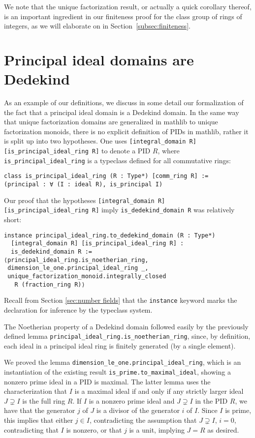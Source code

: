 \documentclass[sn-mathphys]{sn-jnl}%
\newcommand{\lean}[1]{\texttt{#1}\xspace}
\newcommand{\mathlib}{\textsf{mathlib}\xspace}
\begin{document}
We note that the unique factorization result, or actually a quick corollary thereof, is an important ingredient in our finiteness proof for the class group of rings of integers, as we will elaborate on in Section~\ref{subsec:finiteness}.

\section{Principal ideal domains are Dedekind}

As an example of our definitions, we discuss in some detail our formalization of the fact that a principal ideal domain is a Dedekind domain.
In the same way that unique factorization domains are generalized in \mathlib to unique factorization monoids,
there is no explicit definition of PIDs in \mathlib, rather it is split up into two hypotheses.
One uses \lean{[integral\_domain R] [is\_principal\_ideal\_ring R]} to denote a PID $R$,
where \lean{is\_principal\_\-ideal\_\-ring} is a typeclass defined for all commutative rings:
\begin{lstlisting}
class is_principal_ideal_ring (R : Type*) [comm_ring R] :=
(principal : ∀ (I : ideal R), is_principal I)
\end{lstlisting}

Our proof that the hypotheses \lean{[integral\_domain R] [is\_principal\_\-ideal\_\-ring R]} imply \lean{is\_dedekind\_domain R} was relatively short:
\begin{lstlisting}
instance principal_ideal_ring.to_dedekind_domain (R : Type*)
  [integral_domain R] [is_principal_ideal_ring R] :
  is_dedekind_domain R :=
⟨principal_ideal_ring.is_noetherian_ring,
 dimension_le_one.principal_ideal_ring _,
 unique_factorization_monoid.integrally_closed
   R (fraction_ring R)⟩
\end{lstlisting}
Recall from Section \ref{sec:number fields} that the \lean{instance} keyword marks the declaration for inference by the typeclass system.

The Noetherian property of a Dedekind domain followed easily by the previously defined lemma \lean{principal\_ideal\_ring.is\_noetherian\_ring}, since, by definition, each ideal in a principal ideal ring is finitely generated (by a single element).

We proved the lemma \lean{dimension\_le\_one.principal\_ideal\_ring}, which is an instantiation of the existing result \lean{is\_prime.to\_maximal\_ideal}, showing a nonzero prime ideal in a PID is maximal.
The latter lemma uses the characterization that $I$ is a maximal ideal if and only if any strictly larger ideal $J\supsetneq I$ is the full ring $R$.
If $I$ is a nonzero prime ideal and $J \supsetneq I$ in the PID $R$, we have that the generator $j$ of $J$ is a divisor of the generator $i$ of $I$. Since $I$ is prime, this implies that either $j \in I$, contradicting the assumption that $J \supsetneq I$, $i = 0$, contradicting that $I$ is nonzero, or that $j$ is a unit, implying $J = R$ as desired.
\end{document}
